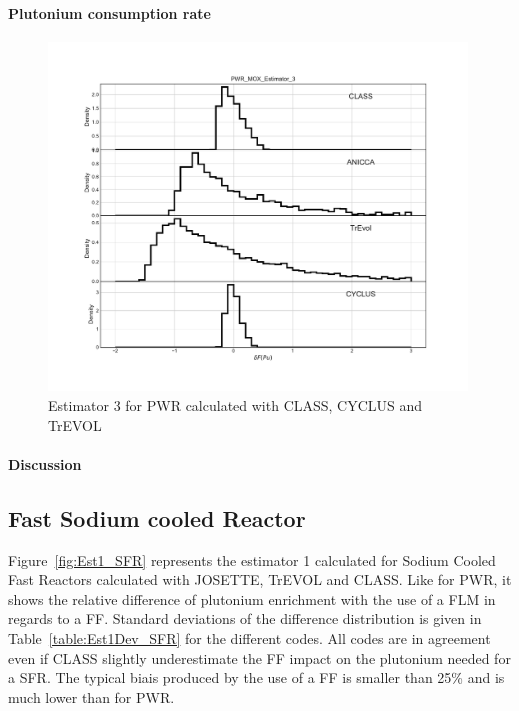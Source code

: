 \paragraph{Plutonium consumption rate}
\begin{figure}[h]
	\begin{center}
		\includegraphics[width = 0.99\textwidth]{../../Feature_1/RAW_DATA/FIG/PWR_MOX_Estimator_3.pdf}
		\caption{Estimator 3 for PWR calculated with CLASS, CYCLUS and TrEVOL}
		\label{fig:Est3_PWR}
	\end{center}
\end{figure}


\paragraph{Discussion}

\subsection{Fast Sodium cooled Reactor}

Figure~\ref{fig:Est1_SFR} represents the estimator 1 calculated for Sodium Cooled Fast Reactors calculated with JOSETTE, TrEVOL and CLASS. Like for PWR, it shows the relative difference of plutonium enrichment with the use of a FLM in regards to a FF. Standard deviations of the difference distribution is given in Table~\ref{table:Est1Dev_SFR} for the different codes. 
All codes are in agreement even if CLASS slightly underestimate the FF impact on the plutonium needed for a SFR. The typical biais produced by the use of a FF is smaller than 25\% and is much lower than for PWR.  

